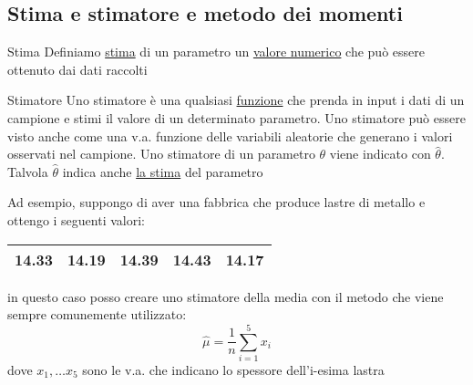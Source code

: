 \subsection{Stima e stimatore e metodo dei momenti}
\begin{definizione}{Stima}
	Definiamo \underline{stima} di un parametro un \underline{valore numerico} che può essere ottenuto dai dati raccolti
\end{definizione}
\begin{definizione}{Stimatore}
	Uno stimatore è una qualsiasi \underline{funzione} che prenda in input i dati di un campione e stimi il valore di un determinato parametro.
	\vskip3mm
	Uno stimatore può essere visto anche come una v.a. funzione delle variabili aleatorie che generano i valori osservati nel campione.
	\vskip3mm
	Uno stimatore di un parametro $ \theta $ viene indicato con $ \hat{\theta} $. Talvola $ \hat{\theta } $ indica anche \underline{la stima} del parametro
\end{definizione}
Ad esempio, suppongo di aver una fabbrica che produce lastre di metallo e ottengo i seguenti valori:
\begin{center}
	\begin{tabular}{|ccccc|}
		\hline
		14.33 & 14.19 & 14.39 & 14.43 & 14.17 \\
		\hline
	\end{tabular}
\end{center}
in questo caso posso creare uno stimatore della media con il metodo che viene sempre comunemente utilizzato:
\[
	\hat{\mu } = \frac{1}{n} \sum_{i=1}^{5} x_i
\]
dove $ x_1, \ldots x_5 $ sono le v.a. che indicano lo spessore dell'i-esima lastra
